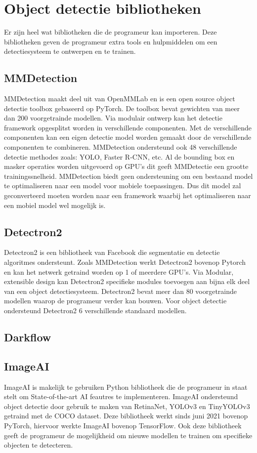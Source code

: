 \section{Object detectie bibliotheken}
Er zijn heel wat bibliotheken die de programeur kan importeren.
Deze bibliotheken geven de programeur extra tools en hulpmiddelen om een detectiesysteem te ontwerpen en te trainen.

\subsection{MMDetection}
MMDetection maakt deel uit van OpenMMLab en is een open source object detectie toolbox gebaseerd op PyTorch.
De toolbox bevat gewichten van meer dan 200 voorgetrainde modellen.
Via modulair ontwerp kan het detectie framework opgesplitst worden in verschillende componenten.
Met de verschillende componenten kan een eigen detectie model worden gemaakt door de verschillende componenten te combineren.
MMDetection ondersteund ook 48 verschillende detectie methodes zoals: YOLO, Faster R-CNN, etc.
Al de bounding box en masker operaties worden uitgevoerd op GPU's dit geeft MMDetectie een grootte trainingssnelheid.
MMDetection biedt geen ondersteuning om een bestaand model te optimaliseren naar een model voor mobiele toepassingen.
Dus dit model zal geconverteerd moeten worden naar een framework waarbij het optimaliseren naar een mobiel model wel mogelijk is.

\subsection{Detectron2}
Detectron2 is een bibliotheek van Facebook die segmentatie en detectie algoritmes ondersteunt.
Zoals MMDetection werkt Detectron2 bovenop Pytorch en kan het netwerk getraind worden op 1 of meerdere GPU's.
Via Modular, extensible design kan Detectron2 specifieke modules toevoegen aan bijna elk deel van een object detectiesysteem.
Detectron2 bevat meer dan 80 voorgetrainde modellen waarop de programeur verder kan bouwen.
Voor object detectie ondersteund Detectron2 6 verschillende standaard modellen.

\subsection{Darkflow}

\subsection{ImageAI}
ImageAI is makelijk te gebruiken Python bibliotheek die de programeur in staat stelt om State-of-the-art AI feautres te implementeren.
ImageAI ondersteund object detectie door gebruik te maken van RetinaNet, YOLOv3 en TinyYOLOv3 getraind met de COCO dataset.
Deze bibliotheek werkt sinds juni 2021 bovenop PyTorch, hiervoor werkte ImageAI bovenop TensorFlow.
Ook deze bibliotheek geeft de programeur de mogelijkheid om nieuwe modellen te trainen om specifieke objecten te detecteren.


